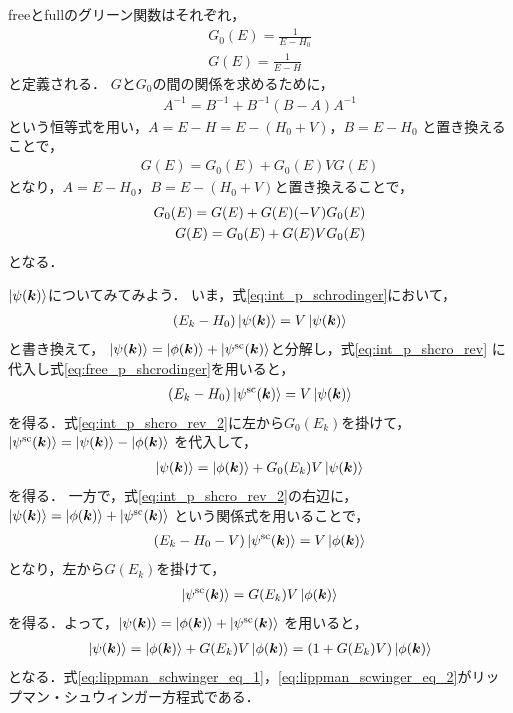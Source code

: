 \documentclass[a4paper,11pt]{ltjsarticle}
\begin{document}
freeとfullのグリーン関数はそれぞれ，
\begin{align}\label{eq:def_green_fnc}
  G_0(E) = \frac{1}{E - H_0} \\
  G(E) = \frac{1}{E- H}
\end{align}
と定義される．
$G$と$G_0$の間の関係を求めるために，
\begin{align*}
  A^{-1} = B^{-1} + B^{-1}(B-A)A^{-1}
\end{align*}
という恒等式を用い，$A = E-H = E - (H_0 + V)$，$B = E - H_0$
と置き換えることで，
\begin{align}\label{eq:G_equal_G_0_equation}
  G(E) = G_0(E) + G_0(E)V G(E)
\end{align}
となり，$A = E - H_0$，$B = E-(H_0 +V)$と置き換えることで，
\begin{align}\label{eq:G_0_equal_G_equation}
  G_0(E) = G(E) + G(E)(-V)G_0(E) \notag \\
  G(E) = G_0(E) + G(E) V G_0(E)  
\end{align}
となる．

$\ket{\psi(\bm{k})}$についてみてみよう．
いま，式\ref{eq:int_p_schrodinger}において，
\begin{align}\label{eq:int_p_shcro_rev}
  (E_k-H_0) \ket{\psi(\bm{k})} = V \ket{\psi(\bm{k})}
\end{align}
と書き換えて，
$\ket{\psi(\bm{k})} = \ket{\phi(\bm{k})} + \ket{\psi^\mathrm{sc} (\bm{k})}$と分解し，式\ref{eq:int_p_shcro_rev}
に代入し式\ref{eq:free_p_shcrodinger}を用いると，
\begin{align}\label{eq:int_p_shcro_rev_2}
  (E_k - H_0) \ket{\psi^\mathrm{sc}(\bm{k})} = V \ket{\psi(\bm{k})}
\end{align}
を得る．式\ref{eq:int_p_shcro_rev_2}に左から$G_0(E_k)$を掛けて，
$\ket{\psi^\mathrm{sc}(\bm{k})} = \ket{\psi (\bm{k})} - \ket{\phi(\bm{k})}$
を代入して，
\begin{align}\label{eq:lippman_schwinger_eq_1}
  \ket{\psi(\bm{k})} = \ket{\phi(\bm{k})} + G_0(E_k) V \ket{\psi(\bm{k})}
\end{align}
を得る．
一方で，式\ref{eq:int_p_shcro_rev_2}の右辺に，$\ket{\psi(\bm{k})} = \ket{\phi(\bm{k})} + \ket{\psi^\mathrm{sc} (\bm{k})}$
という関係式を用いることで，
\begin{align}\label{eq:inti_p_shcro_rev_3}
  (E_k - H_0 - V) \ket{\psi^\mathrm{sc}(\bm{k})} = V \ket{\phi(\bm{k})}
\end{align}
となり，左から$G(E_k)$を掛けて，
\begin{align*}
  \ket{\psi^\mathrm{sc}(\bm{k})} = G(E_k) V \ket{\phi(\bm{k})}
\end{align*}
を得る．よって，$\ket{\psi(\bm{k})} = \ket{\phi(\bm{k})} + \ket{\psi^\mathrm{sc} (\bm{k})}$
を用いると，
\begin{align}\label{eq:lippman_scwinger_eq_2}
  \ket{\psi(\bm{k})} = \ket{\phi(\bm{k})} + G(E_k) V \ket{\phi(\bm{k})} = (1 + G(E_k) V) \ket{\phi(\bm{k})}
\end{align}
となる．式\ref{eq:lippman_schwinger_eq_1}，\ref{eq:lippman_scwinger_eq_2}がリップマン・シュウィンガー方程式である．
\end{document}
